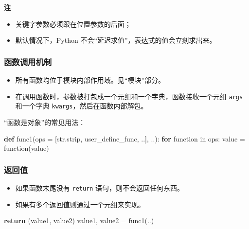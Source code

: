 \documentclass[]{ctexart}
\newenvironment{Shaded}{}{}
\newcommand{\KeywordTok}[1]{\textcolor[rgb]{0.00,0.44,0.13}{\textbf{{#1}}}}
\newcommand{\ControlFlowTok}[1]{\textcolor[rgb]{0.00,0.44,0.13}{\textbf{{#1}}}}
\newcommand{\OperatorTok}[1]{\textcolor[rgb]{0.40,0.40,0.40}{{#1}}}
\newcommand{\BuiltInTok}[1]{{#1}}
\newcommand{\NormalTok}[1]{{#1}}
\begin{document}
\textbf{注}

\begin{itemize}
\item
  关键字参数必须跟在位置参数的后面；
\item
  默认情况下，Python 不会``延迟求值''，表达式的值会立刻求出来。
\end{itemize}

\subsubsection{函数调用机制}\label{header-n229}

\begin{itemize}
\item
  所有函数均位于模块内部作用域。见``模块''部分。
\item
  在调用函数时，参数被打包成一个元组和一个字典，函数接收一个元组
  \texttt{args} 和一个字典 \texttt{kwargs}，然后在函数内部解包。
\end{itemize}

``函数是对象''的常见用法：

\begin{Shaded}
\begin{Highlighting}[]
\KeywordTok{def} \NormalTok{func1(ops }\OperatorTok{=} \NormalTok{[}\BuiltInTok{str}\NormalTok{.strip, user_define_func, ..], ..):}
  \ControlFlowTok{for} \NormalTok{function }\OperatorTok{in} \NormalTok{ops:}
    \NormalTok{value }\OperatorTok{=} \NormalTok{function(value)}
\end{Highlighting}
\end{Shaded}

\subsubsection{返回值}\label{header-n240}

\begin{itemize}
\item
  如果函数末尾没有 \texttt{return} 语句，则不会返回任何东西。
\item
  如果有多个返回值则通过一个元组来实现。
\end{itemize}

\begin{Shaded}
\begin{Highlighting}[]
\ControlFlowTok{return} \NormalTok{(value1, value2)}
\NormalTok{value1, value2 }\OperatorTok{=} \NormalTok{func1(..)}
\end{Highlighting}
\end{Shaded}
\end{document}
